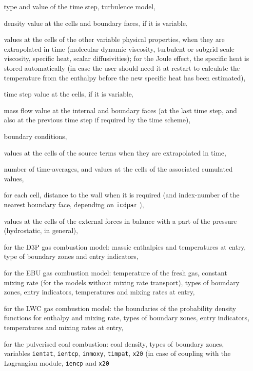 {{{\begin{list}{-}{}
\item type and value of the time step, turbulence model,
\item density value at the cells and boundary faces, if it is variable,
\item values at the cells of the other variable physical properties,
when they are extrapolated in time (molecular dynamic viscosity, turbulent or
subgrid scale viscosity, specific heat, scalar diffusivities); for the Joule
effect, the specific heat is stored automatically (in case the user should need
it at restart to calculate the temperature from the enthalpy before the new
specific heat has been estimated),
\item time step value at the cells, if it is variable,
\item mass flow value at the internal and boundary faces (at the last
time step, and also at the previous time step if required by the time scheme),
\item boundary conditions,
\item values at the cells of the source terms when they are extrapolated in time,
\item number of time-averages, and values at the cells of the associated
cumulated values,
\item for each cell, distance to the wall when it is required (and
index-number of the nearest boundary face, depending on \texttt{icdpar}%
),
\item values at the cells of the external forces in balance with a part
of the pressure (hydrostatic, in general),
\item for the D3P gas combustion model: massic enthalpies and temperatures at entry,
type of boundary zones and entry indicators,
\item for the EBU gas combustion model: temperature of the fresh gas, constant
mixing rate (for the models without mixing rate transport), types of boundary
zones, entry indicators, temperatures and mixing rates at entry,
\item for the LWC gas combustion model: the boundaries of the probability
density functions for enthalpy and mixing rate, types of boundary
zones, entry indicators, temperatures and mixing rates at entry,
\item for the pulverised coal combustion: coal density,  types of boundary
zones, variables \texttt{ientat}, \texttt{ientcp}, \texttt{inmoxy}, \texttt{timpat}, \texttt{x20}
(in case of coupling with the Lagrangian module, \texttt{iencp} and \texttt{x20}

\end{list}}}}
